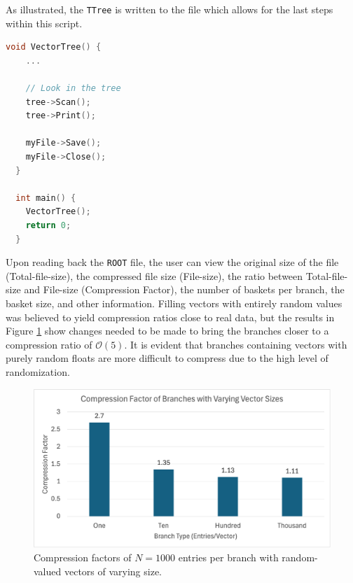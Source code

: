 As illustrated, the \verb|TTree| is written to the file which allows for the last steps within this script. 

\begin{lstlisting}[language=C]  
  void VectorTree() {
    ...

    // Look in the tree
    tree->Scan();
    tree->Print();

    myFile->Save();
    myFile->Close();
  }

  int main() {
    VectorTree();
    return 0;
  } 
\end{lstlisting}

Upon reading back the \verb|ROOT| file, the user can view the original size of the file (Total-file-size), the compressed file size (File-size), the ratio between Total-file-size and File-size (Compression Factor), the number of baskets per branch, the basket size, and other information. 
Filling vectors with entirely random values was believed to yield compression ratios close to real data, but the results in Figure \ref{fig:toymodel_compF_rndm_vectors} show changes needed to be made to bring the branches closer to a compression ratio of $\mathcal{O}(5)$.  
It is evident that branches containing vectors with purely random floats are more difficult to compress due to the high level of randomization.

\begin{figure}[h]
    \centering
    \includegraphics[width=.8\textwidth]{content/toymodel_content/branch_compfacts_nomix.png}
    \caption{Compression factors of $N=1000$ entries per branch with random-valued vectors of varying size.}
    \label{fig:toymodel_compF_rndm_vectors}
\end{figure}



